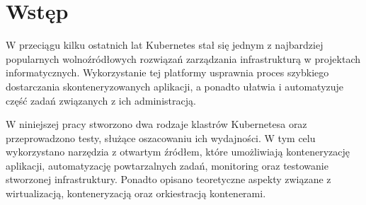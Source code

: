 \chapter*{Wstęp}

W przeciągu kilku ostatnich lat Kubernetes stał się jednym z najbardziej popularnych wolnoźródłowych rozwiązań zarządzania infrastrukturą w projektach informatycznych. Wykorzystanie tej platformy usprawnia proces szybkiego dostarczania skonteneryzowanych aplikacji, a ponadto ułatwia i automatyzuje część zadań związanych z ich administracją. 

W niniejszej pracy stworzono dwa rodzaje klastrów Kubernetesa oraz przeprowadzono testy, służące oszacowaniu ich wydajności. W tym celu wykorzystano narzędzia z otwartym źródłem, które umożliwiają konteneryzację aplikacji, automatyzację powtarzalnych zadań, monitoring oraz testowanie stworzonej infrastruktury. Ponadto opisano teoretyczne aspekty związane z wirtualizacją, konteneryzacją oraz orkiestracją kontenerami. 
